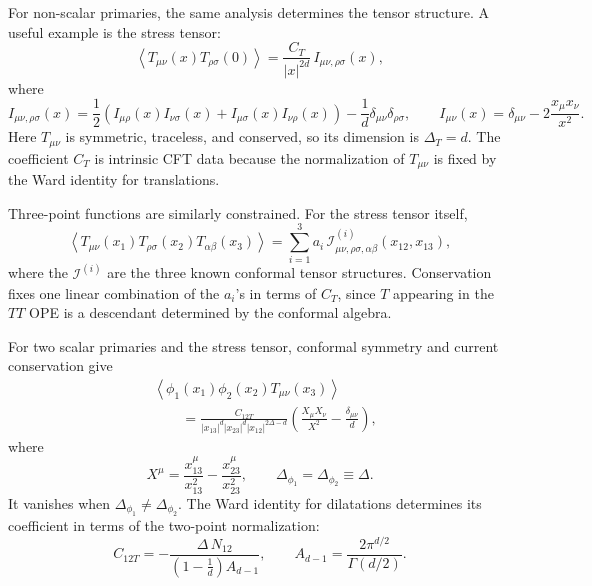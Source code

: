 For non-scalar primaries, the same analysis determines the tensor
structure.  A useful example is the stress tensor:
\[
  \left\langle T_{\mu\nu}(x)T_{\rho\sigma}(0)\right\rangle
  =
  \frac{C_T}{|x|^{2d}}\,I_{\mu\nu,\rho\sigma}(x),
\]
where
\[
  I_{\mu\nu,\rho\sigma}(x)
  =
  \frac12\left(I_{\mu\rho}(x)I_{\nu\sigma}(x)
  +I_{\mu\sigma}(x)I_{\nu\rho}(x)\right)
  -\frac1d\delta_{\mu\nu}\delta_{\rho\sigma},
  \qquad
  I_{\mu\nu}(x)=\delta_{\mu\nu}-2\frac{x_\mu x_\nu}{x^2}.
\]
Here \(T_{\mu\nu}\) is symmetric, traceless, and conserved, so its
dimension is \(\Delta_T=d\).  The coefficient \(C_T\) is intrinsic CFT
data because the normalization of \(T_{\mu\nu}\) is fixed by the Ward
identity for translations.

Three-point functions are similarly constrained.  For the stress tensor
itself,
\[
  \left\langle
    T_{\mu\nu}(x_1)T_{\rho\sigma}(x_2)T_{\alpha\beta}(x_3)
  \right\rangle
  =
  \sum_{i=1}^3
  a_i\,\mathcal I^{(i)}_{\mu\nu,\rho\sigma,\alpha\beta}(x_{12},x_{13}),
\]
where the \(\mathcal I^{(i)}\) are the three known conformal tensor
structures.  Conservation fixes one linear combination of the \(a_i\)'s
in terms of \(C_T\), since \(T\) appearing in the \(TT\) OPE is a
descendant determined by the conformal algebra.

For two scalar primaries and the stress tensor, conformal symmetry and
current conservation give
\[
\begin{aligned}
  &\left\langle
    \phi_1(x_1)\phi_2(x_2)T_{\mu\nu}(x_3)
  \right\rangle  \\
  &\qquad =
  \frac{C_{12T}}
  {|x_{13}|^d|x_{23}|^d|x_{12}|^{2\Delta-d}}
  \left(
    \frac{X_\mu X_\nu}{X^2}-\frac{\delta_{\mu\nu}}d
  \right),
\end{aligned}
\]
where
\[
  X^\mu=\frac{x_{13}^\mu}{x_{13}^2}
       -\frac{x_{23}^\mu}{x_{23}^2},
  \qquad
  \Delta_{\phi_1}=\Delta_{\phi_2}\equiv\Delta.
\]
It vanishes when \(\Delta_{\phi_1}\ne\Delta_{\phi_2}\).  The Ward
identity for dilatations determines its coefficient in terms of the
two-point normalization:
\[
  C_{12T}
  =
  -\frac{\Delta\,N_{12}}
  {\left(1-\frac1d\right)A_{d-1}},
  \qquad
  A_{d-1}=\frac{2\pi^{d/2}}{\Gamma(d/2)}.
\]

